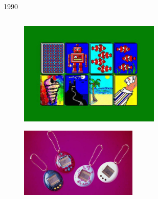 \documentclass[10pt, compress, aspectratio=169]{beamer}
\begin{document}
\begin{frame}{1990}
  \begin{columns}[T]
    \begin{column}{.5\textwidth}
      \begin{figure}[ht]
        \centering
        \includegraphics[width=0.6\textwidth, keepaspectratio=true]{images/1990_1.jpg}
      \end{figure}
      \begin{figure}[ht]
        \centering
        \includegraphics[width=0.5\textwidth, keepaspectratio=true]{images/1990_2.jpg}
      \end{figure}
    \end{column}


\end{columns}
\end{frame}
\end{document}
